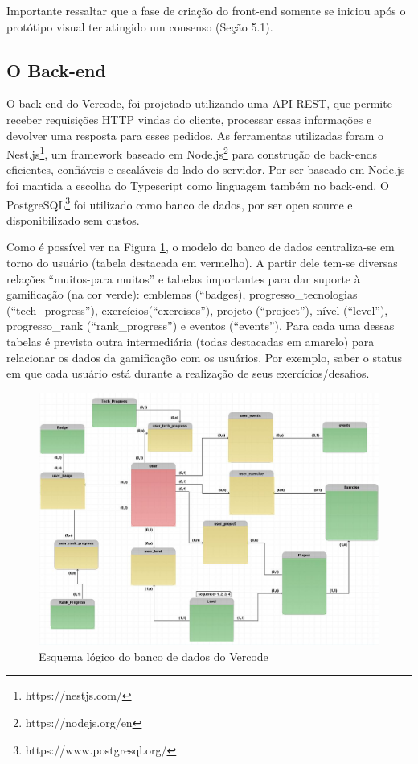 \documentclass[12pt]{article}
\begin{document}
Importante ressaltar que a fase de criação do front-end somente se iniciou após o protótipo visual ter atingido um consenso (Seção 5.1).

\subsection{O Back-end} \label{sec:back_end}

O back-end do Vercode, foi projetado utilizando uma API REST, que permite receber requisições HTTP vindas do cliente, processar essas informações e devolver uma resposta para esses pedidos. As ferramentas utilizadas foram o Nest.js\footnote{https://nestjs.com/}, um framework baseado em Node.js\footnote{https://nodejs.org/en} para construção de back-ends eficientes, confiáveis e escaláveis do lado do servidor. Por ser baseado em Node.js foi mantida a escolha do Typescript como linguagem também no back-end. O PostgreSQL\footnote{https://www.postgresql.org/} foi utilizado como banco de dados, por ser  open source e disponibilizado sem custos.

Como é possível ver na Figura \ref{fig:tabelas}, o modelo do banco de dados centraliza-se em torno do usuário (tabela destacada em vermelho). A partir dele tem-se diversas relações “muitos-para muitos” e tabelas importantes para dar suporte à gamificação (na cor verde): emblemas (“badges), progresso\_tecnologias (“tech\_progress”), exercícios(“exercises”), projeto (“project”), nível (“level”), progresso\_rank (“rank\_progress”) e eventos (“events”). Para cada uma dessas tabelas é prevista outra intermediária (todas destacadas em amarelo) para relacionar os dados da gamificação com os usuários.  Por exemplo, saber o status em que cada usuário está durante a realização de seus exercícios/desafios.

\begin{figure}[ht!]
\centering
\includegraphics[width=1.0\textwidth]{imagens/tabelas.jpg}
\caption{Esquema lógico do banco de dados do Vercode}
\label{fig:tabelas}
\end{figure}
\end{document}
